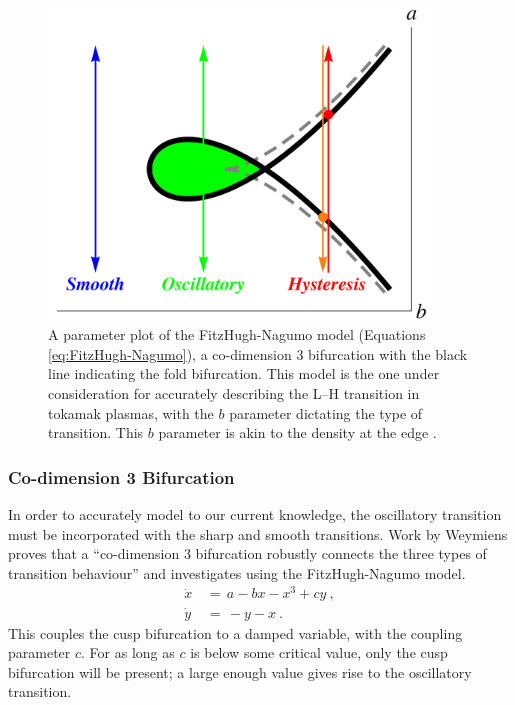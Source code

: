 \begin{figure}[tb] %
\begin{minipage}{0.49\linewidth}
	\centering
	\includegraphics[width=0.9\textwidth]{../Graphics/Bif_Graphs/3_transitions_single_simple.png}
\end{minipage}
\hfill
\begin{minipage}{0.49\linewidth}
	\caption{A parameter plot of the FitzHugh-Nagumo model (Equations \ref{eq:FitzHugh-Nagumo}), a co-dimension 3 bifurcation with the black line indicating the fold bifurcation.
	This model is the one under consideration for accurately describing the L--H transition in tokamak plasmas, with the $b$ parameter dictating the type of transition.
	This $b$ parameter is akin to the density at the edge \cite{weymiens_bifurcation_2014}.}
	\label{fig:co-3}
\end{minipage}
\end{figure}

\subsubsection{Co-dimension 3 Bifurcation}
In order to accurately model to our current knowledge, the oscillatory transition must be incorporated with the sharp and smooth transitions.
Work by Weymiens \cite{weymiens_bifurcation_2014} proves that a ``co-dimension 3 bifurcation robustly connects the three types of transition behaviour'' and investigates using the FitzHugh-Nagumo model.
\begin{subequations}
\begin{align} %
	\dot{x} \,&=\, a - bx - x^3 + cy~, \\
	\dot{y} \,&=\, -y - x~.
\end{align}
	\label{eq:FitzHugh-Nagumo}
\end{subequations}
This couples the cusp bifurcation to a damped variable, with the coupling parameter $c$.
For as long as $c$ is below some critical value, only the cusp bifurcation will be present; a large enough value gives rise to the oscillatory transition.

